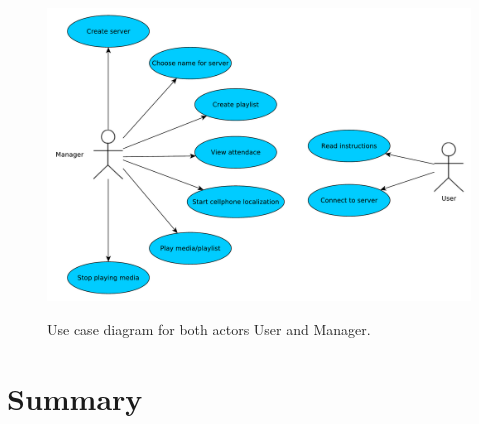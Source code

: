 \begin{figure}[h]
    \begin{center}
    \includegraphics[scale=0.4]{images/usecase.pdf}
    \label{img:usecase}
    \caption{Use case diagram for both actors User and Manager.}
    \end{center}
\end{figure}

\section{Summary}
